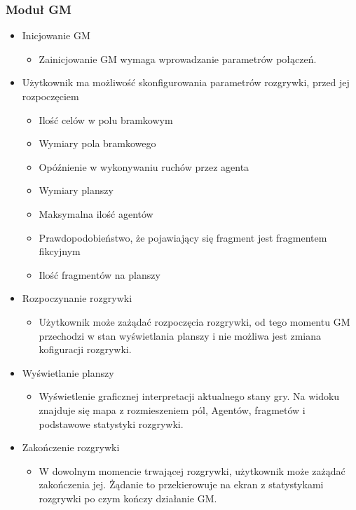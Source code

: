 \documentclass[../Dokumentacja.tex]{subfiles}
\begin{document}
\subsubsection{Moduł GM}
\begin{itemize}
	\item Inicjowanie GM
	\begin{itemize}
		\item Zainicjowanie GM wymaga wprowadzanie parametrów połączeń.
	\end{itemize}
	\item Użytkownik ma możliwość skonfigurowania parametrów rozgrywki, przed jej rozpoczęciem
	\begin{itemize}
		\item Ilość celów w polu bramkowym
		\item Wymiary pola bramkowego
		\item Opóźnienie w wykonywaniu ruchów przez agenta
		\item Wymiary planszy
		\item Maksymalna ilość agentów
		\item Prawdopodobieństwo, że pojawiający się fragment jest fragmentem fikcyjnym
		\item Ilość fragmentów na planszy
	\end{itemize}
	\item Rozpoczynanie rozgrywki
	\begin{itemize}
		\item Użytkownik może zażądać rozpoczęcia rozgrywki, od tego momentu GM przechodzi w stan wyświetlania planszy i nie możliwa jest zmiana kofiguracji rozgrywki.
	\end{itemize}
	\item Wyświetlanie planszy
	\begin{itemize}
		\item Wyświetlenie graficznej interpretacji aktualnego stany gry. Na widoku znajduje się mapa z rozmieszeniem pól, Agentów, fragmetów i podstawowe statystyki rozgrywki.
	\end{itemize}
	\item Zakończenie rozgrywki
	\begin{itemize}
		\item W dowolnym momencie trwającej rozgrywki, użytkownik może zażądać zakończenia jej. Żądanie to przekierowuje na ekran z statystykami rozgrywki po czym kończy działanie GM.
	\end{itemize}
\end{itemize}
\end{document}
